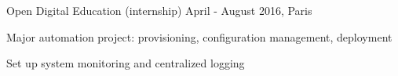 \begin{cventries}

\cventry
{} %
{Open Digital Education (internship)} %
{April - August 2016, Paris} %
{} %
{ %
\begin{cvitems}
\item {Major automation project: provisioning, configuration management, deployment}
\item {Set up system monitoring and centralized logging}
\end{cvitems}
}



\end{cventries}
